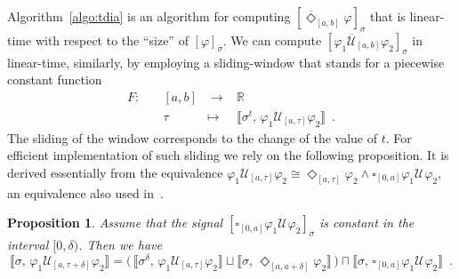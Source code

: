 \documentclass[envcountsect,orivec]{llncs} \usepackage{etex} \usepackage[]{graphicx}
\newtheorem{myproposition}[mytheorem]{Proposition}
\newcommand{\R}{{\mathbb{R}}}
\newcommand{\UntilOp}[1]{\mathbin{\mathcal{U}_{#1}}}
\newcommand{\TUntil}[1]{\mathbin{\overline{\mathcal{U}}_{#1}}}
\newcommand{\DiaOp}[1]{\Diamond_{#1}}
\newcommand{\BoxOp}[1]{\square_{#1}}
\newcommand{\TDiaOp}[1]{\overline{\Diamond}_{#1}}
\newcommand{\Robust}[2]{{ \llbracket #1,\, #2 \rrbracket}}
\begin{document}
 Algorithm~\ref{algo:tdia}
is an algorithm for computing $[\TDiaOp{[a,b]}
\varphi]_{\sigma}$
that is linear-time
with respect to the ``size'' of $[\varphi]_{\sigma}$.
We can compute $[\varphi_1 \TUntil{[a,b]} \varphi_2]_{\sigma}$
in linear-time, similarly,
by employing a sliding-window 
that stands for a piecewise constant function
\[
  \begin{array}{cccc}
    F:\quad & [a, b] & \;\longrightarrow\; & \R \\
       & \tau & \longmapsto & \Robust{\sigma^t}{\varphi_1 \UntilOp{[a, \tau]} \varphi_2}\enspace.
  \end{array}
\]
The sliding of the window corresponds to the change of the value of $t$.
For efficient implementation of such sliding we rely on the following
proposition. It is derived essentially from 
the equivalence $\varphi_1 \UntilOp{[a, \tau]} \varphi_2 \cong 
\DiaOp{[a, \tau]} \varphi_2 \wedge \BoxOp{[0,a]} \varphi_1 \UntilOp{}
\varphi_2$, an equivalence also used  in~\cite{DBLP:conf/cav/DonzeFM13}.
\begin{myproposition}\label{prop:TUntilAlgo}
Assume
that the signal
 $[\BoxOp{[0,a]}\varphi_{1}\UntilOp{} \varphi_{2}]_{\sigma}$ is constant
 in the interval $[0,\delta)$. Then we have
\begin{equation}\label{eq:propTUntilAlgo}
     \Robust{\sigma}{\varphi_1 \UntilOp{[a, \tau + \delta]} \varphi_2}
    = 
    \bigl(\,\Robust{\sigma^\delta}{\varphi_1 \UntilOp{[a, \tau]} \varphi_2} 
    \sqcup \Robust{\sigma}{\DiaOp{[a,a+\delta]} \varphi_2}\,\bigr)
    \sqcap \Robust{\sigma}{\BoxOp{[0,a]} \varphi_1 \UntilOp{} \varphi_2}\enspace.
\end{equation}
\end{myproposition}
\end{document}
